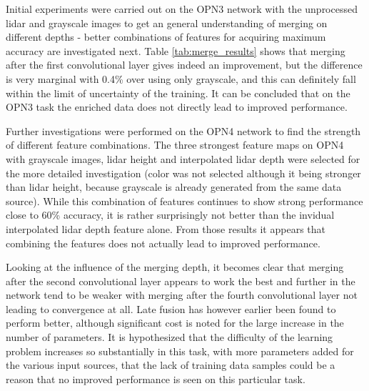 Initial experiments were carried out on the OPN3 network with the unprocessed lidar and grayscale images to get an general understanding of merging on different depths - better combinations of features for acquiring maximum accuracy are investigated next. Table \ref{tab:merge_results} shows that merging after the first convolutional layer gives indeed an improvement, but the difference is very marginal with 0.4\% over using only grayscale, and this can definitely fall within the limit of uncertainty of the training. It can be concluded that on the OPN3 task the enriched data does not directly lead to improved performance. 

Further investigations were performed on the OPN4 network to find the strength of different feature combinations. The three strongest feature maps on OPN4 with grayscale images, lidar height and interpolated lidar depth were selected for the more detailed investigation (color was not selected although it being stronger than lidar height, because grayscale is already generated from the same data source). While this combination of features continues to show strong performance close to 60\% accuracy, it is rather surprisingly not better than the invidual interpolated lidar depth feature alone. From those results it appears that combining the features does not actually lead to improved performance. 

Looking at the influence of the merging depth, it becomes clear that merging after the second convolutional layer appears to work the best and further in the network tend to be weaker with merging after the fourth convolutional layer not leading to convergence at all. Late fusion has however earlier been found to perform better\cite{schlosser2016}, although significant cost is noted for the large increase in the number of parameters. It is hypothesized that the difficulty of the learning problem increases so substantially in this task, with more parameters added for the various input sources, that the lack of training data samples could be a reason that no improved performance is seen on this particular task. 

